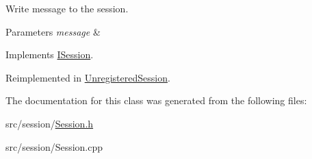Write message to the session. 


\begin{DoxyParams}{Parameters}
{\em message} & \\
\hline
\end{DoxyParams}


Implements \hyperlink{class_i_session_acbf362464fcfb9210001ebc85a074401}{I\-Session}.



Reimplemented in \hyperlink{class_unregistered_session_a494b190737e24094eb9f7ba68e8453c8}{Unregistered\-Session}.



The documentation for this class was generated from the following files\-:\begin{DoxyCompactItemize}
\item 
src/session/\hyperlink{_session_8h}{Session.\-h}\item 
src/session/Session.\-cpp\end{DoxyCompactItemize}
